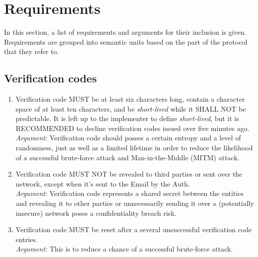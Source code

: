 \section{Requirements}
In this section, a list of requirements and arguments for their inclusion is given. Requirements are grouped into 
semantic units based on the part of the protocol that they refer to.

    \subsection{Verification codes}
        \begin{enumerate}
            \item Verification code MUST be at least six characters long, contain a character space of at 
                  least ten characters, and be \textit{short-lived} while it SHALL NOT be predictable. It is 
                  left up to the implementer to define \textit{short-lived}, but it is RECOMMENDED to decline 
                  verification codes issued over five minutes ago.\\    
            \textit{Argument:} Verification code should posses a certain entropy and a level of randomness, 
                               just as well as a limited lifetime in order to reduce  the likelihood of a 
                               successful brute-force attack and Man-in-the-Middle (MITM) attack.

            \item Verification code MUST NOT be revealed to third parties or sent over the network, 
                  except when it's sent to the Email by the Auth.\\        
            \textit{Argument:} Verification code represents a shared secret between the entities and revealing 
                               it to other parties or unnecessarily sending it over a (potentially insecure) 
                               network poses a confidentiality breach risk.

            \item Verification code MUST be reset after a several unsuccessful verification code entries.\\        
            \textit{Argument:} This is to reduce a chance of a successful brute-force attack.
        \end{enumerate}

